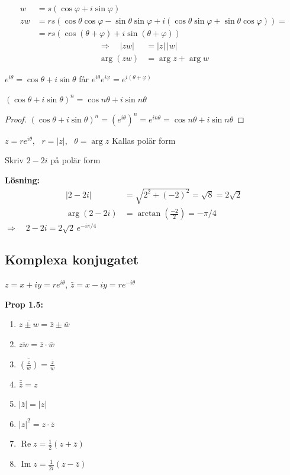 \begin{align*}
  w &= s(\cos\varphi + i\sin\varphi) \\
  zw &= rs(\cos\theta\cos\varphi - \sin\theta\sin\varphi + i(\cos\theta\sin\varphi + \sin\theta\cos\varphi)) = \\
  &= rs(\cos(\theta+\varphi) + i\sin(\theta+\varphi))
\end{align*}
\begin{align*}
  \Rightarrow \quad |zw| &= |z|\,|w| \\
  \arg(zw) &= \arg z + \arg w
\end{align*}

\begin{definition}
$e^{i\theta} = \cos\theta + i\sin\theta$ \qquad får $e^{i\theta}e^{i\varphi} = e^{i(\theta+\varphi)}$
\end{definition}

\begin{theorem}[De Moivre]
$(\cos\theta + i\sin\theta)^n = \cos n\theta + i\sin n\theta$
\end{theorem}
\begin{proof}
$(\cos\theta + i\sin\theta)^n = (e^{i\theta})^n = e^{in\theta} = \cos n\theta + i\sin n\theta$
\end{proof}

$z = re^{i\theta}$, \ $r = |z|$, \ $\theta = \arg z$ \quad \textcolor{magenta!80!black}{Kallas polär form}

\begin{example}
Skriv $2 - 2i$ på polär form

\textbf{Lösning:}
\begin{align*}
  |2 - 2i| &= \sqrt{2^2 + (-2)^2} = \sqrt{8} = 2\sqrt{2} \\
  \arg(2 - 2i) &= \arctan\left(\frac{-2}{2}\right) = -\pi/4
\end{align*}
$\Rightarrow \quad 2 - 2i = 2\sqrt{2}\, e^{-i\pi/4}$
\end{example}

\subsection{Komplexa konjugatet}
$z = x + iy = re^{i\theta}$, \quad $\bar{z} = x - iy = re^{-i\theta}$

\textbf{Prop 1.5:}
\begin{enumerate}[label=\alph*)]
  \item $\overline{z \pm w} = \bar{z} \pm \bar{w}$
  \item $\overline{zw} = \bar{z} \cdot \bar{w}$
  \item $\overline{\left(\frac{z}{w}\right)} = \frac{\bar{z}}{\bar{w}}$
  \item $\bar{\bar{z}} = z$
  \item $|\bar{z}| = |z|$
  \item $|z|^2 = z \cdot \bar{z}$
  \item $\operatorname{Re} z = \frac{1}{2}(z + \bar{z})$
  \item $\operatorname{Im} z = \frac{1}{2i}(z - \bar{z})$
\end{enumerate}

